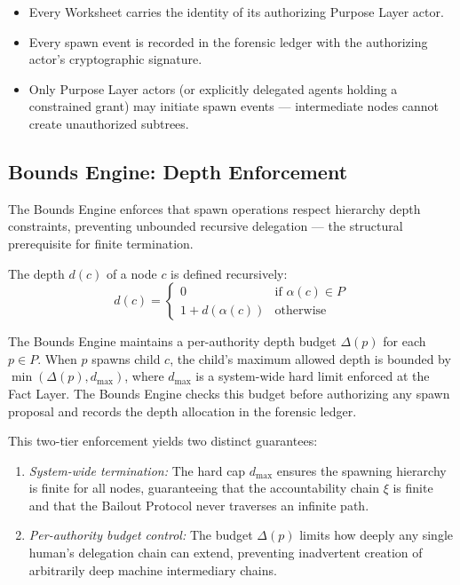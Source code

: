 \begin{itemize}
    \itemsep0em
    \item Every Worksheet carries the identity of its authorizing Purpose Layer actor.
    \item Every spawn event is recorded in the forensic ledger with the authorizing actor's cryptographic signature.
    \item Only Purpose Layer actors (or explicitly delegated agents holding a constrained grant) may initiate spawn events — intermediate nodes cannot create unauthorized subtrees.
\end{itemize}

\subsection{Bounds Engine: Depth Enforcement}
\label{sec:bounds-depth}

The Bounds Engine enforces that spawn operations respect hierarchy depth constraints, preventing unbounded recursive delegation — the structural prerequisite for finite termination.

The depth $d(c)$ of a node $c$ is defined recursively:
\begin{equation}
d(c) = \begin{cases}
0 & \text{if } \alpha(c) \in P \\
1 + d(\alpha(c)) & \text{otherwise}
\end{cases}
\tag{2}
\end{equation}

The Bounds Engine maintains a per-authority depth budget $\Delta(p)$ for each $p \in P$. When $p$ spawns child $c$, the child's maximum allowed depth is bounded by $\min(\Delta(p), d_{\max})$, where $d_{\max}$ is a system-wide hard limit enforced at the Fact Layer. The Bounds Engine checks this budget before authorizing any spawn proposal and records the depth allocation in the forensic ledger.

This two-tier enforcement yields two distinct guarantees:

\begin{enumerate}
    \itemsep0em
    \item \textit{System-wide termination:} The hard cap $d_{\max}$ ensures the spawning hierarchy is finite for all nodes, guaranteeing that the accountability chain $\xi$ is finite and that the Bailout Protocol never traverses an infinite path.
    \item \textit{Per-authority budget control:} The budget $\Delta(p)$ limits how deeply any single human's delegation chain can extend, preventing inadvertent creation of arbitrarily deep machine intermediary chains.
\end{enumerate}

